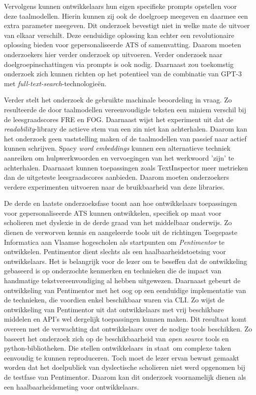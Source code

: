 \medspace

Vervolgens kunnen ontwikkelaars hun eigen specifieke prompts opstellen voor deze taalmodellen. Hierin kunnen zij ook de doelgroep meegeven en daarmee een extra parameter meegeven. Dit onderzoek bevestigt niet in welke mate de uitvoer van elkaar verschilt. Deze eenduidige oplossing kan echter een revolutionaire oplossing bieden voor gepersonaliseerde ATS of samenvatting. Daarom moeten onderzoekers hier verder onderzoek op uitvoeren. Verder onderzoek naar doelgroepinschattingen via prompts is ook nodig. Daarnaast zou toekomstig onderzoek zich kunnen richten op het potentieel van de combinatie van GPT-3 met \textit{full-text-search}-technologieën. 

\medspace

Verder stelt het onderzoek de gebruikte machinale beoordeling in vraag. Zo resulteerde de door taalmodellen vereenvoudigde teksten een miniem verschil bij de leesgraadscores FRE en FOG. Daarnaast wijst het experiment uit dat de \textit{readability}-library de actieve stem van een zin niet kan achterhalen. Daarom kan het onderzoek geen vaststelling maken of de taalmodellen van passief naar actief kunnen schrijven. Spacy \textit{word embeddings} kunnen een alternatieve techniek aanreiken om hulpwerkwoorden en vervoegingen van het werkwoord 'zijn' te achterhalen. Daarnaast kunnen toepassingen zoals TextInspector meer metrieken dan de uitgeteste leesgraadscores aanbieden. Daarom moeten onderzoekers verdere experimenten uitvoeren naar de bruikbaarheid van deze libraries. 

\medspace

De derde en laatste onderzoeksfase toont aan hoe ontwikkelaars toepassingen voor gepersonaliseerde ATS kunnen ontwikkelen, specifiek op maat voor scholieren met dyslexie in de derde graad van het middelbaar onderwijs. Zo dienen de verworven kennis en aangeleerde tools uit de richtingen Toegepaste Informatica aan Vlaamse hogescholen als startpunten om \textit{Pentimentor} te ontwikkelen. Pentimentor dient slechts als een haalbaarheidstoetsing voor ontwikkelaars. Het is belangrijk voor de lezer om te beseffen dat de ontwikkeling gebaseerd is op onderzochte kenmerken en technieken die de impact van handmatige tekstvereenvoudiging al hebben uitgewezen. Daarnaast gebeurt de ontwikkeling van Pentimentor met het oog op een eenduidige implementatie van de technieken, die voordien enkel beschikbaar waren via CLI. Zo wijst de ontwikkeling van Pentimentor uit dat ontwikkelaars met vrij beschikbare middelen en API's wel dergelijk toepassingen kunnen maken. Dit resultaat komt overeen met de verwachting dat ontwikkelaars over de nodige tools beschikken. Zo baseert het onderzoek zich op de beschikbaarheid van \textit{open source} tools en python-bibliotheken. Die stellen ontwikkelaars in staat om complexe taken eenvoudig te kunnen reproduceren. Toch moet de lezer ervan bewust gemaakt worden dat het doelpubliek van dyslectische scholieren niet werd opgenomen bij de testfase van Pentimentor. Daarom kan dit onderzoek voornamelijk dienen als een haalbaarheidsmeting voor ontwikkelaars.

